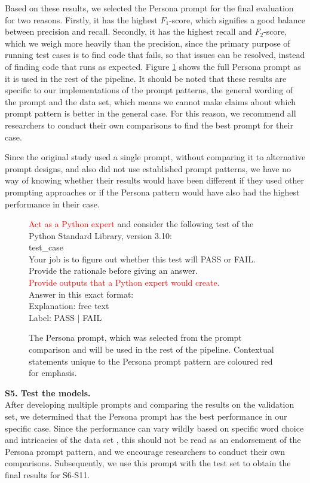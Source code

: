 \documentclass[a4paper]{article}
\newcommand{\infobox}[2]{
	\begin{tcolorbox}[
		skin=widget,
		boxrule=1mm,
		coltitle=black,
		colframe=darkishgray,
		colback=lightergray,
		width=(\linewidth),
		before=\hfill,
		after=\hfill,
		before skip=1pt,
		adjusted title={#1}
		]
		#2
	\end{tcolorbox}
}
\begin{document}
Based on these results, we selected the Persona prompt for the final evaluation for two reasons. Firstly, it has the highest $F_1$-score, which signifies a good balance between precision and recall. Secondly, it has the highest recall and $F_2$-score, which we weigh more heavily than the precision, since the primary purpose of running test cases is to find code that fails, so that issues can be resolved, instead of finding code that runs as expected. Figure \ref{fig:persona_prompt} shows the full Persona prompt as it is used in the rest of the pipeline. It should be noted that these results are specific to our implementations of the prompt patterns, the general wording of the prompt and the data set, which means we cannot make claims about which prompt pattern is better in the general case. For this reason, we recommend all researchers to conduct their own comparisons to find the best prompt for their case. 

Since the original study used a single prompt, without comparing it to alternative prompt designs, and also did not use established prompt patterns, we have no way of knowing whether their results would have been different if they used other prompting approaches or if the Persona pattern would have also had the highest performance in their case. 

\begin{figure}[H]
	\centering
	\infobox{Persona Prompt}{\textcolor{red}{Act as a Python expert} and consider the following test of the Python Standard
		Library, version 3.10:\\
		\textlangle test\_case\textrangle\\
		Your job is to figure out whether this test will PASS or
		FAIL. Provide the rationale before giving an answer.\\
		\textcolor{red}{Provide outputs that a Python expert would create.}\\
		
		Answer in this exact format:\\
		Explanation: \textlangle free text\textrangle\\
		Label: \textlangle PASS $\vert$ FAIL\textrangle}
	\caption{The Persona prompt, which was selected from the prompt comparison and will be used in the rest of the pipeline. Contextual statements unique to the Persona prompt pattern are coloured red for emphasis.}
	\label{fig:persona_prompt}
\end{figure}

\textbf{S5. Test the models.}\\
After developing multiple prompts and comparing the results on the validation set, we determined that the Persona prompt has the best performance in our specific case. Since the performance can vary wildly based on specific word choice and intricacies of the data set \cite{sclar2024quantifyinglanguagemodelssensitivity,mizrahi2024stateartmultipromptllm}, this should not be read as an endorsement of the Persona prompt pattern, and we encourage researchers to conduct their own comparisons. Subsequently, we use this prompt with the test set to obtain the final results for S6-S11. 
\end{document}
